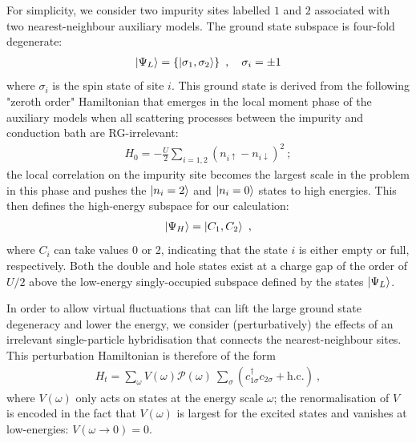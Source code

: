 \documentclass[reprint,hidelinks,onecolumn]{revtex4-2}
\begin{document}
For simplicity, we consider two impurity sites labelled \(1\) and \(2\) associated with two nearest-neighbour auxiliary models. The ground state subspace is four-fold degenerate:
\begin{equation}\begin{aligned}
	\ket{\Psi_L} = \left\{\ket{\sigma_1,\sigma_2}\right\}~,\quad \sigma_i = \pm 1
\end{aligned}\end{equation}
where \(\sigma_i\) is the spin state of site \(i\). This ground state is derived from the following "zeroth order" Hamiltonian that emerges in the local moment phase of the auxiliary models when all scattering processes between the impurity and conduction bath are RG-irrelevant:
\begin{equation}\begin{aligned}
	H_0 = -\frac{U}{2}\sum_{i=1,2}\left(n_{i \uparrow} - n_{i \downarrow}\right)^2~;
\end{aligned}\end{equation}
the local correlation on the impurity site becomes the largest scale in the problem in this phase and pushes the \(\ket{n_i=2}\) and \(\ket{n_i=0}\) states to high energies. This then defines the high-energy subspace for our calculation:
\begin{equation}\begin{aligned}
	\ket{\Psi_H} = \ket{C_1,C_2}~,
\end{aligned}\end{equation}
where \(C_i\) can take values 0 or 2, indicating that the state \(i\) is either empty or full, respectively. Both the double and hole states exist at a charge gap of the order of \(U/2\) above the low-energy singly-occupied subspace defined by the states \(\ket{\Psi_L}\).

In order to allow virtual fluctuations that can lift the large ground state degeneracy and lower the energy, we consider (perturbatively) the effects of an irrelevant single-particle hybridisation that connects the nearest-neighbour sites. This perturbation Hamiltonian is therefore of the form
\begin{equation}\begin{aligned}
	H_t = \sum_\omega V(\omega) \mathcal{P}(\omega)~\sum_\sigma\left(c^\dagger_{1\sigma}c_{2\sigma} + \text{h.c.}\right) ~,
\end{aligned}\end{equation}
where \(V(\omega)\) only acts on states at the energy scale \(\omega\); the renormalisation of \(V\) is encoded in the fact that \(V(\omega)\) is largest for the excited states and vanishes at low-energies: \(V(\omega \to 0) = 0\).
\end{document}
